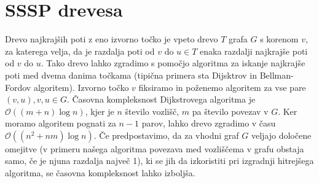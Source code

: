 \documentclass[a4paper, 12pt]{book}
\newcommand{\OO}{\ensuremath{\mathcal{O}}} %
\begin{document}
\section{SSSP drevesa}
Drevo najkrajših poti z eno izvorno točko je vpeto drevo $T$ grafa $G$ s korenom $v$, za katerega velja, da je razdalja poti od $v$ do $u \in T$ enaka razdalji najkrajše poti od $v$ do $u$. Tako drevo lahko zgradimo s pomočjo algoritma za iskanje najkrajše poti med dvema danima točkama (tipična primera sta Dijsktrov in Bellman-Fordov algoritem). Izvorno točko $v$ fiksiramo in poženemo algoritem za vse pare $(v, u), v,u \in G.$ Časovna kompleksnost Dijkstrovega algoritma je $\OO((m+n)\log n)$, kjer je $n$ število vozlišč, $m$ pa število povezav v $G$. Ker moramo algoritem pognati za $n-1$ parov, lahko drevo zgradimo v času $\OO((n^2 + nm)\log n)$. Če predpostavimo, da za vhodni graf $G$ veljajo določene omejitve (v primeru našega algoritma povezava med vozliščema v grafu obstaja samo, če je njuna razdalja največ 1), ki se jih da izkoristiti pri izgradnji hitrejšega algoritma, se časovna kompleksnost lahko izboljša.
\end{document}
